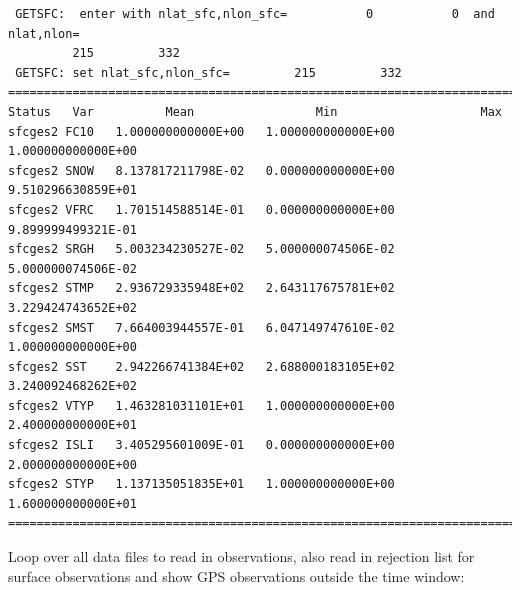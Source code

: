 \begin{scriptsize}
\begin{verbatim}
 GETSFC:  enter with nlat_sfc,nlon_sfc=           0           0  and nlat,nlon=
         215         332
 GETSFC: set nlat_sfc,nlon_sfc=         215         332
================================================================================
Status   Var          Mean                 Min                    Max
sfcges2 FC10   1.000000000000E+00   1.000000000000E+00   1.000000000000E+00
sfcges2 SNOW   8.137817211798E-02   0.000000000000E+00   9.510296630859E+01
sfcges2 VFRC   1.701514588514E-01   0.000000000000E+00   9.899999499321E-01
sfcges2 SRGH   5.003234230527E-02   5.000000074506E-02   5.000000074506E-02
sfcges2 STMP   2.936729335948E+02   2.643117675781E+02   3.229424743652E+02
sfcges2 SMST   7.664003944557E-01   6.047149747610E-02   1.000000000000E+00
sfcges2 SST    2.942266741384E+02   2.688000183105E+02   3.240092468262E+02
sfcges2 VTYP   1.463281031101E+01   1.000000000000E+00   2.400000000000E+01
sfcges2 ISLI   3.405295601009E-01   0.000000000000E+00   2.000000000000E+00
sfcges2 STYP   1.137135051835E+01   1.000000000000E+00   1.600000000000E+01
================================================================================
\end{verbatim}
\end{scriptsize}
Loop over all data files to read in observations, also read in rejection list for surface observations and show GPS observations outside the time window:

